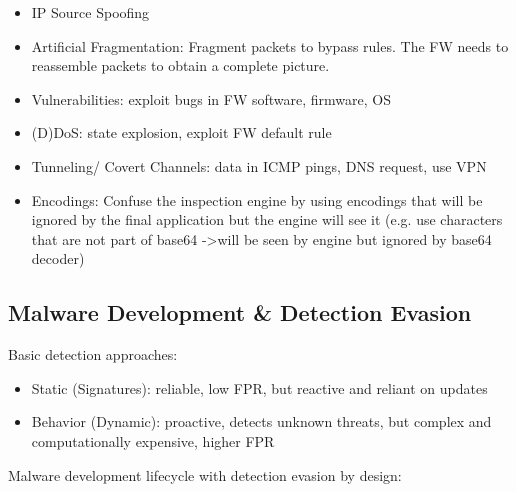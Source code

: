 \documentclass[11pt,oneside,a4paper]{article}
\begin{document}
\vspace{-\topsep}
\begin{itemize}
	\setlength{\itemsep}{0pt}
	\setlength{\parskip}{0pt}
	\item IP Source Spoofing
	\item Artificial Fragmentation: Fragment packets to bypass rules. The FW needs to reassemble packets to obtain a complete picture.
	\item Vulnerabilities: exploit bugs in FW software, firmware, OS
	\item (D)DoS: state explosion, exploit FW default rule
	\item Tunneling/ Covert Channels: data in ICMP pings, DNS request, use VPN
	\item Encodings: Confuse the inspection engine by using encodings that will be ignored by the final application but the engine will see it (e.g. use characters that are not part of base64 -\textgreater will be seen by engine but ignored by base64 decoder)
\end{itemize}
\vspace{-\topsep}

\subsection{Malware Development	\& Detection Evasion}

Basic detection approaches:

\vspace{-\topsep}
\begin{itemize}
	\setlength{\itemsep}{0pt}
	\setlength{\parskip}{0pt}
	\item Static (Signatures): reliable, low FPR, but reactive and reliant on updates
	\item Behavior (Dynamic): proactive, detects unknown threats, but complex and computationally expensive, higher FPR
\end{itemize}
\vspace{-\topsep}

\noindent Malware development lifecycle with detection evasion by design:
\end{document}

